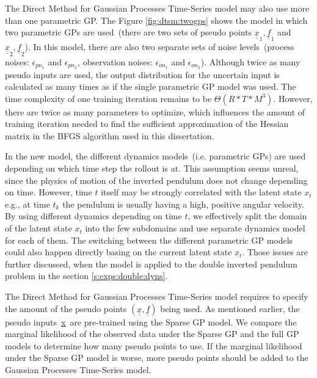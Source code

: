 \noindent The Direct Method for Gaussian Processes Time-Series model may also use more than one parametric GP. The Figure \ref{fig:dtsm:twogps} shows the model in which two parametric GPs are used\ (there are two sets of pseudo points $\underline{\underline{x}}_1, \underline{\underline{f}}_1$ and $\underline{\underline{x}}_2, \underline{\underline{f}}_2$). In this model, there are also two separate sets of noise levels\ (process noises: $\epsilon_{pn_{1}}$ and $\epsilon_{pn_{2}}$, observation noises: $\epsilon_{on_{1}}$ and $\epsilon_{on_{2}}$). Although twice as many pseudo inputs are used, the output distribution for the uncertain input is calculated as many times as if the single parametric GP model was used. The time complexity of one training iteration remains to be $\Theta(R*T*M^3)$. However, there are twice as many parameters to optimize, which influences the amount of training iteration needed to find the sufficient approximation of the Hessian matrix in the BFGS algorithm used in this dissertation.

\noindent In the new model, the different dynamics models\ (i.e. parametric GPs) are used depending on which time step the rollout is at. This assumption seems unreal, since the physics of motion of the inverted pendulum does not change depending on time. However, time $t$ itself may be strongly correlated with the latent state $x_{t}$ e.g., at time $t_{k}$ the pendulum is usually having a high, positive angular velocity. By using different dynamics depending on time $t$, we effectively split the domain of the latent state $x_{t}$ into the few subdomains and use separate dynamics model for each of them. The switching between the different parametric GP models could also happen directly basing on the current latent state $x_{t}$. Those issues are further discussed, when the model is applied to the double inverted pendulum problem in the section \ref{s:exps:double:dyns}.

\noindent The Direct Method for Gaussian Processes Time-Series model requires to specify the amount of the pseudo points $(\underline{\underline{x}}, \underline{\underline{f}})$ being used. As mentioned earlier, the pseudo inputs\ \underline{\underline{x}}\ are pre-trained using the Sparse GP model. We compare the marginal likelihood of the observed data under the Sparse GP and the full GP models to determine how many pseudo points to use. If the marginal likelihood under the Sparse GP model is worse, more pseudo points should be added to the Gaussian Processes Time-Series model.

